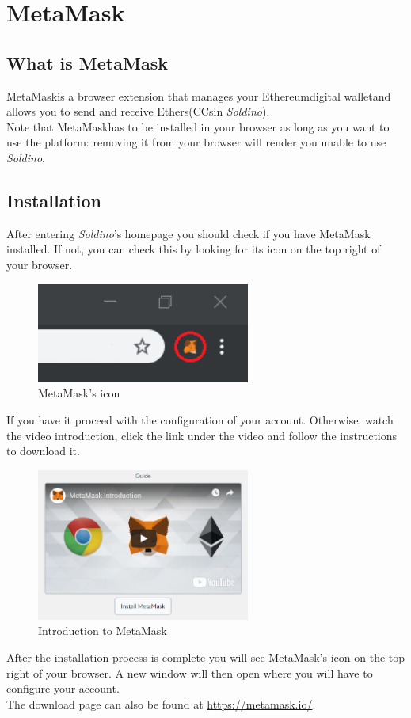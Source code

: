 \section{MetaMask}
	\subsection{What is MetaMask}
	MetaMask\glosp is a browser extension that manages your Ethereum\glosp digital wallet\glosp and 
	allows you to send and receive Ethers\glosp (CCs\glosp in \textit{Soldino}). 
	\\
	Note that MetaMask\glosp has to be installed in your browser as long as you want 
	to use the platform: removing it from your browser will render you unable 
	to use \textit{Soldino}.
	\subsection{Installation}
	After entering \textit{Soldino}'s homepage you should check if you have MetaMask\glosp 
	installed. If not, you can check this by looking for its icon on the top right of your browser.
	\begin{figure}[H]
		\includegraphics[width=7cm]{res/images/metamask_icon.png}
		\centering
		\caption{MetaMask's icon}
	\end{figure}
	\noindent If you have it proceed with the configuration of your account.
	Otherwise, watch the video introduction, click the link under the video and 
	follow the instructions to download it. 
	\begin{figure}[H]
		\includegraphics[width=7cm]{res/images/metamask_download.png}
		\centering
		\caption{Introduction to MetaMask}
	\end{figure}
	\noindent After the installation process is 
	complete you will see MetaMask\glo's icon on the top right of your browser. A 
	new window will then open where you will have to configure your account.\\
	The download page can also be found at \url{https://metamask.io/}.
